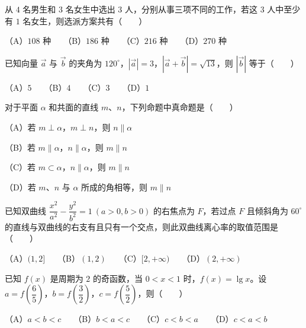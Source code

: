 \begin{question}
从 $4$ 名男生和 $3$ 名女生中选出 $3$ 人，分别从事三项不同的工作，若这 $3$ 人中至少有 $1$ 名女生，则选派方案共有\mbox{（　　）}

（A）$108$ 种　　（B）$186$ 种　　（C）$216$ 种　　（D）$270$ 种

\end{question}
\begin{question}
已知向量 $\vec a$ 与 $\vec b$ 的夹角为 $120^\circ$，$|\vec a|=3$，$|\vec a+\vec b|=\sqrt{13}$，则 $|\vec b|$ 等于\mbox{（　　）}

（A）$5$　　（B）$4$　　（C）$3$　　（D）$1$

\end{question}
\begin{question}
对于平面 $\alpha$ 和共面的直线 $m$、$n$，下列命题中真命题是\mbox{（　　）}

（A）若 $m\perp\alpha$，$m\perp n$，则 $n\parallel\alpha$

（B）若 $m\parallel\alpha$，$n\parallel\alpha$，则 $m\parallel n$

（C）若 $m\subset\alpha$，$n\parallel\alpha$，则 $m\parallel n$

（D）若 $m$、$n$ 与 $\alpha$ 所成的角相等，则 $m\parallel n$

\end{question}
\begin{question}
已知双曲线 $\dfrac{x^2}{a^2}-\dfrac{y^2}{b^2}=1\ (a>0, b>0)$ 的右焦点为 $F$，若过点 $F$ 且倾斜角为 $60^\circ$ 的直线与双曲线的右支有且只有一个交点，则此双曲线离心率的取值范围是\mbox{（　　）}

（A）$(1,2]$　　（B）$(1,2)$　　（C）$[2,+\infty)$　　（D）$(2,+\infty)$

\end{question}
\begin{question}
已知 $f(x)$ 是周期为 $2$ 的奇函数，当 $0<x<1$ 时，$f(x)=\lg x$。设 $a=f\left(\dfrac65\right)$，$b=f\left(\dfrac32\right)$，$c=f\left(\dfrac52\right)$，则\mbox{（　　）}

（A）$a<b<c$　　（B）$b<a<c$　　（C）$c<b<a$　　（D）$c<a<b$

\end{question}

